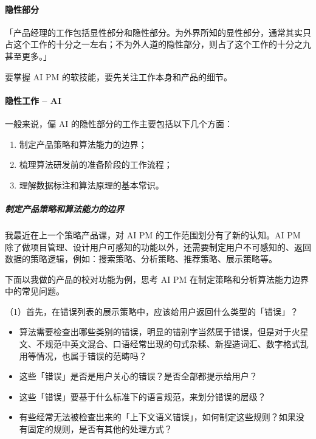 \documentclass[letterpaper,10pt,english]{sphinxmanual}
\begin{document}
\paragraph{隐性部分}
\label{\detokenize{chapter_experience/recessive_work:id2}}
「产品经理的工作包括显性部分和隐性部分。为外界所知的显性部分，通常其实只占这个工作的十分之一左右；不为外人道的隐性部分，则占了这个工作的十分之九甚至更多。」

要掌握 AI PM 的软技能，要先关注工作本身和产品的细节。
%
\begin{footnote}[701]\sphinxAtStartFootnote
{}
%
\end{footnote}


\paragraph{隐性工作 – AI}
\label{\detokenize{chapter_experience/recessive_work:ai}}
一般来说，偏 AI 的隐性部分的工作主要包括以下几个方面：
\begin{enumerate}
%
\item {} 
制定产品策略和算法能力的边界；

\item {} 
梳理算法研发前的准备阶段的工作流程；

\item {} 
理解数据标注和算法原理的基本常识。

\end{enumerate}


\subparagraph{制定产品策略和算法能力的边界}
\label{\detokenize{chapter_experience/recessive_work:id3}}
我最近在上一个策略产品课，对 AI PM 的工作范围划分有了新的认知。AI PM
除了做项目管理、设计用户可感知的功能以外，还需要制定用户不可感知的、返回数据的策略逻辑，例如：搜索策略、分析策略、推荐策略、展示策略等。

下面以我做的产品的校对功能为例，思考 AI PM
在制定策略和分析算法能力边界中的常见问题。

（1）首先，在错误列表的展示策略中，应该给用户返回什么类型的「错误」？
\begin{itemize}
\item {} 
算法需要检查出哪些类别的错误，明显的错别字当然属于错误，但是对于火星文、不规范中英文混合、口语经常出现的句式杂糅、新捏造词汇、数字格式乱用等情况，也属于错误的范畴吗？

\item {} 
这些「错误」是否是用户关心的错误？是否全部都提示给用户？

\item {} 
这些「错误」要基于什么标准下的语言规范，来划分错误的层级？

\item {} 
有些经常无法被检查出来的「上下文语义错误」，如何制定这些规则？如果没有固定的规则，是否有其他的处理方式？

\end{itemize}
\end{document}
